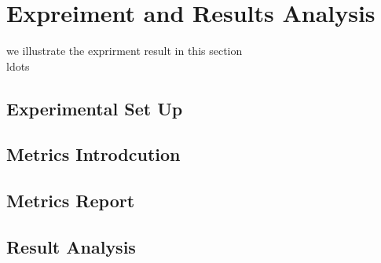 
\section{Expreiment and Results Analysis}

we illustrate the exprirment result in this section \\ldots
\subsection{Experimental Set Up}
\subsection{Metrics Introdcution}
\subsection{Metrics Report}
\subsection{Result Analysis}